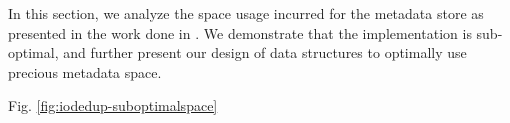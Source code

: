 
In this section, we analyze the space usage incurred for the metadata
store as presented in the work done in \cite{iodedup}. We demonstrate that
the implementation is sub-optimal, and further present our design of
data structures to optimally use precious metadata space.

Fig. \ref{fig:iodedup-suboptimalspace}
